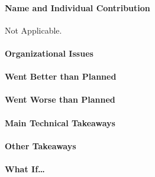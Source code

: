 \documentclass[12pt, a4paper]{report}
\begin{document}
\paragraph{Name and Individual Contribution} Not Applicable.

\paragraph{Organizational Issues}

\paragraph{Went Better than Planned}

\paragraph{Went Worse than Planned}

\paragraph{Main Technical Takeaways}

\paragraph{Other Takeaways}

\paragraph{What If\ldots}
\end{document}
